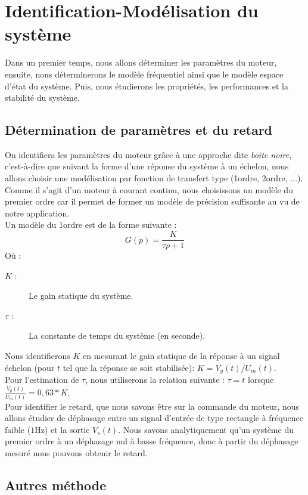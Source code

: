 \chapter{Identification-Modélisation du système}
Dans un premier temps, nous allons déterminer les paramètres du moteur, ensuite, nous déterminerons le modèle fréquentiel ainsi que le modèle espace d'état du système. Puis, nous étudierons les propriétés, les performances et la stabilité du système. 
	\section{Détermination de paramètres et du retard}
	On identifiera les paramètres du moteur grâce à une approche dite \emph{boite noire}, c'est-à-dire que suivant la forme d'une réponse du système à un échelon, nous allons choisir une modélisation par fonction de transfert type (1\ier ordre, 2\ieme ordre, ...). Comme il s'agit d'un moteur à courant continu, nous choisissons un modèle du premier ordre car il permet de former un modèle de précision suffisante au vu de notre application.\\
Un modèle du 1\ier ordre est de la forme suivante :
\begin{equation}
G(p) = \frac{K}{\tau p+1}
\end{equation}
Où : 
\begin{description}
\item[$K$ :] Le gain statique du système.
\item[$\tau$ :] La constante de temps du système (en seconde).
\end{description}

\noindent Nous identifierons $K$ en mesurant le gain statique  de la réponse à un signal échelon (pour $t$ tel que la réponse se soit stabilisée): $ K = V_g(t)/U_m(t)$.\\
\noindent Pour l'estimation de $\tau$, nous utiliserons la relation suivante : $ \tau = t$ lorsque $\frac{V_g(t)}{U_m(t)} = 0,63*K $.\\

Pour identifier le retard, que nous savons être sur la commande du moteur, nous allons étudier de déphasage entre un signal d'entrée de type rectangle à fréquence faible ($1$Hz) et la sortie $V_s(t)$. Nous savons analytiquement qu'un système du premier ordre à un déphasage nul à basse fréquence, donc à partir du déphasage mesuré nous pouvons obtenir le retard.

	\section{Autres méthode}
